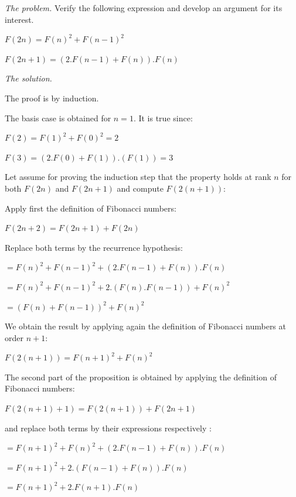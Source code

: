 %


\noindent \textit{The problem.} Verify the following expression and develop an argument for its interest.

$F(2n) = F(n)^2 + F(n-1)^2$

$F(2n+1) = (2.F(n-1) + F(n)).F(n)$
\medskip

\noindent \textit{The solution.}

The proof is by induction.

The basis case is obtained for $n=1$.
It is true since:

$F(2) = F(1)^2+F(0)^2 = 2$

$F(3) = (2.F(0)+F(1)).(F(1)) = 3$
\medskip

Let assume for proving the induction step that the property holds at rank $n$ 
for both $F(2n)$ and $F(2n+1)$ and compute $F(2(n+1))$:

Apply first the definition of Fibonacci numbers: 

$F(2n+2) = F(2n+1)+F(2n)$ 

Replace both terms by the recurrence hypothesis:

$= F(n)^2 + F(n-1)^2 + (2.F(n-1) + F(n)).F(n)$

$= F(n)^2 + F(n-1)^2 + 2.(F(n).F(n-1)) + F(n)^2$

$= (F(n) + F(n-1))^2 + F(n)^2$

We obtain the result by applying again the definition of Fibonacci numbers at order $n+1$:

$F(2(n+1)) = F(n+1)^2 + F(n)^2$
\medskip

The second part of the proposition is obtained by applying the definition of Fibonacci numbers:

$F(2(n+1)+1) = F(2(n+1)) + F(2n+1)$

and replace both terms by their expressions respectively :

$= F(n+1)^2 + F(n)^2 + (2.F(n-1) + F(n)).F(n)$

$= F(n+1)^2 + 2.(F(n-1) + F(n)).F(n)$

$= F(n+1)^2 + 2.F(n+1).F(n)$
\medskip

